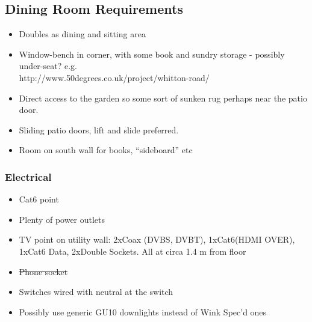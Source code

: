 \subsection{Dining Room Requirements}
\begin{itemize}
\item Doubles as dining and sitting area

\item Window-bench in corner, with some book and sundry storage - possibly under-seat? e.g. \\ http://www.50degrees.co.uk/project/whitton-road/
\item Direct access to the garden so some sort of sunken rug perhaps near the patio door.
\item Sliding patio doors, lift and slide preferred.
\item Room on south wall for books, ``sideboard'' etc
    

\end{itemize}

\subsubsection{Electrical}
\begin{itemize}
\item Cat6 point
\item Plenty of power outlets
\item TV point on utility wall: 2xCoax (DVBS, DVBT), 1xCat6(HDMI OVER), 1xCat6 Data, 2xDouble Sockets. All at circa 1.4 m from floor
\item \sout{Phone socket}   
\item Switches wired with neutral at the switch
\item Possibly use generic GU10 downlights instead of Wink Spec'd ones

\end{itemize}

